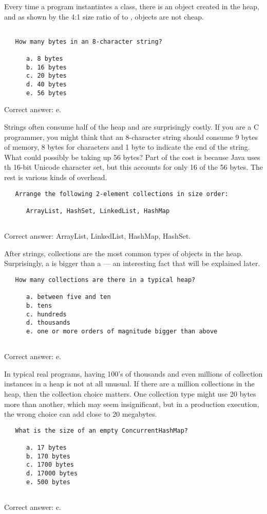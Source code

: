  Every time
a program instantiates a class, there is an object created in the heap, and as
shown by the 4:1 size ratio of  to , objects are not
cheap.
\begin{verbatim}
   
   How many bytes in an 8-character string?

      a. 8 bytes
      b. 16 bytes
      c. 20 bytes
      d. 40 bytes
      e. 56 bytes

\end{verbatim}
Correct answer: e.

Strings often consume half of the heap and are
surprisingly costly. If you are a C programmer, you might think that an 8-character string should consume 9 bytes
of memory, 8 bytes for characters and 1 byte to indicate the end of the string.
What could possibly be taking up 56 bytes? Part of the cost is because Java uses
th 16-bit Unicode character set, but this accounts for only 16 of the 56 bytes.
The rest is various kinds of overhead.
\begin{verbatim}             
   Arrange the following 2-element collections in size order:
    
      ArrayList, HashSet, LinkedList, HashMap
      
\end{verbatim}
Correct answer: ArrayList, LinkedList, HashMap, HashSet.
  
After strings,
collections are the most common types of objects in the heap. Surprisingly, a
 is bigger than a  --- an interesting fact that
will be explained later.
\begin{verbatim}      
   How many collections are there in a typical heap?
   
      a. between five and ten
      b. tens
      c. hundreds
      d. thousands
      e. one or more orders of magnitude bigger than above
      
\end{verbatim}
Correct answer: e.
 
In typical real programs, having 100's of thousands and
even millions of collection instances in a heap is not at all unusual. If there are a million collections in
the heap, then the collection choice matters. One collection type might use 20
bytes more than another, which may seem insignificant, but in a production
execution, the wrong choice can add close to 20 megabytes.
\begin{verbatim}
   What is the size of an empty ConcurrentHashMap?
   
      a. 17 bytes
      b. 170 bytes
      c. 1700 bytes
      d. 17000 bytes
      e. 500 bytes
                 
\end{verbatim}
Correct answer: c.
 
